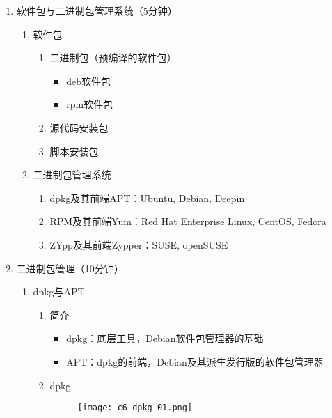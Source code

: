 \documentclass{TIJMUjiaoanSY}
\begin{document}
\noindent
\begin{enumerate}
  \item 软件包与二进制包管理系统（5分钟）
	    \vspace*{-10pt}
	\begin{multicols}{2}
    \begin{enumerate}
          \item 软件包
	\begin{enumerate}
	  \item 二进制包（预编译的软件包）
	    \begin{itemize}
	      \item deb软件包
	      \item rpm软件包
	    \end{itemize}
	  \item 源代码安装包
	  \item 脚本安装包
	\end{enumerate}
      \item 二进制包管理系统
	\begin{enumerate}
          \item dpkg及其前端APT：Ubuntu, Debian, Deepin
          \item RPM及其前端Yum：Red Hat Enterprise Linux, CentOS, Fedora
          \item ZYpp及其前端Zypper：SUSE, openSUSE
	\end{enumerate}
    \end{enumerate}
      \end{multicols}
	    \vspace*{-10pt}
  \item 二进制包管理（10分钟）
    \begin{enumerate}
      \item dpkg与APT
        \begin{enumerate}
	  \item 简介
	    \begin{itemize}
	      \item dpkg：底层工具，Debian软件包管理器的基础
	      \item APT：dpkg的前端，Debian及其派生发行版的软件包管理器
	    \end{itemize}
          \item dpkg
	    \vspace*{-10pt}
	    \begin{figure}[h]
	      \centering
	      \texttt{[image: c6\_dpkg\_01.png]}
	    \end{figure}
	    \vspace*{-10pt}

\end{enumerate}
\end{enumerate}
\end{enumerate}
\end{document}
